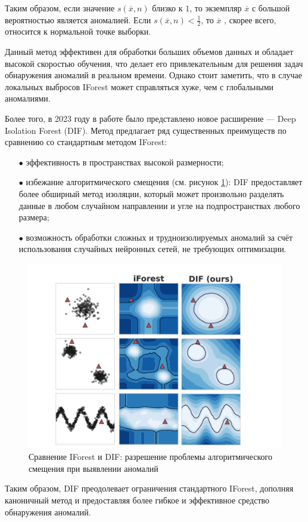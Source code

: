 Таким образом, если значение $s(\overline{x}, n)$ близко к $1$, то экземпляр $\overline{x}$ с большой вероятностью является аномалией. Если $s(\overline{x}, n) < \tfrac{1}{2}$, то $\overline{x}$ , скорее всего, относится к нормальной точке выборки.

Данный метод эффективен для обработки больших объемов данных и обладает высокой скоростью обучения, что делает его привлекательным для решения задач обнаружения аномалий в реальном времени. Однако стоит заметить, что в случае локальных выбросов IForest может справляться хуже, чем с глобальными аномалиями.

Более того, в 2023 году в работе \cite{DIF} было представлено новое расширение --- Deep Isolation Forest (DIF). Метод предлагает ряд существенных преимуществ по сравнению со стандартным методом IForest:

\begin{itemize}[leftmargin=0pt,itemindent=4.6em]
    \item[$\bullet$] эффективность в пространствах высокой размерности;
    \item[$\bullet$] избежание алгоритмического смещения (см. рисунок \ref{fig:iforest-and-dif-comparison}): DIF предоставляет более обширный метод изоляции, который может произвольно разделять данные в любом случайном направлении и угле на подпространствах любого размера;
    \item[$\bullet$] возможность обработки сложных и трудноизолируемых аномалий за счёт использования случайных нейронных сетей, не требующих оптимизации.
\end{itemize}

\begin{figure}
  \centering
  \includegraphics[scale=0.235]{inc/images/iforest-and-dif-comparison.png}
  \caption{Сравнение IForest и DIF: разрешение проблемы алгоритмического смещения при выявлении аномалий \cite{DIF}}
  \label{fig:iforest-and-dif-comparison}
\end{figure}

Таким образом, DIF преодолевает ограничения стандартного IForest, дополняя каноничный метод и предоставляя более гибкое и эффективное средство обнаружения аномалий.

